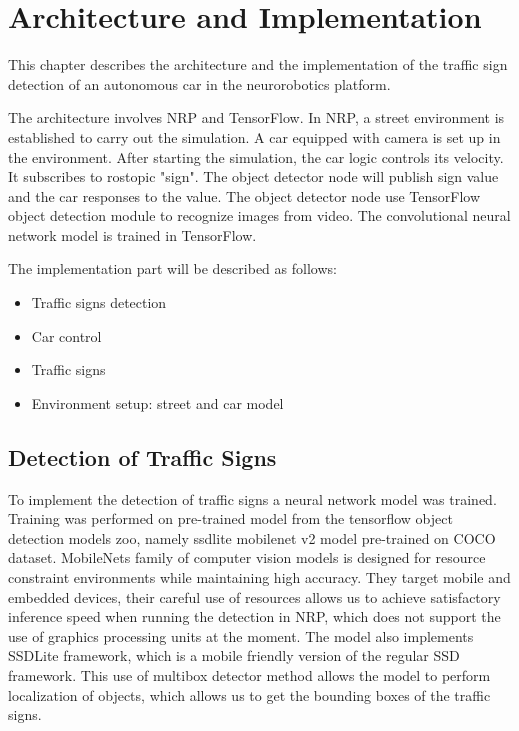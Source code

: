 
\section{Architecture and Implementation}

This chapter describes the architecture and the implementation of the traffic sign detection of an autonomous car in the neurorobotics platform. 

The architecture involves NRP and TensorFlow. In NRP, a street environment is established to carry out the simulation. A car equipped with camera is set up in the environment. After starting the simulation, the car logic controls its velocity. It subscribes to rostopic "sign". The object detector node will publish sign value and the car responses to the value. The object detector node use TensorFlow object detection module to recognize images from video. The convolutional neural network model is trained in TensorFlow.

The implementation part will be described as follows: 
\begin{itemize}
	\item Traffic signs detection
	\item Car control
	\item Traffic signs
	\item Environment setup: street and car model
	 
\end{itemize}

\subsection{Detection of Traffic Signs}

To implement the detection of traffic signs a neural network model was trained. Training was performed on pre-trained model from the tensorflow object detection models zoo, namely ssdlite mobilenet v2 model pre-trained on COCO dataset\cite{DBLP:journals/corr/HuangRSZKFFWSG016}. MobileNets family of computer vision models is designed for resource constraint environments while maintaining high accuracy. They target mobile and embedded devices, their careful use of resources allows us to achieve satisfactory inference speed when running the detection in NRP, which does not support the use of graphics processing units at the moment. The model also implements SSDLite framework, which is a mobile friendly version of the regular SSD framework\cite{DBLP:journals/corr/abs-1801-04381}. This use of multibox detector method allows the model to perform localization of objects, which allows us to get the bounding boxes of the traffic signs. 


